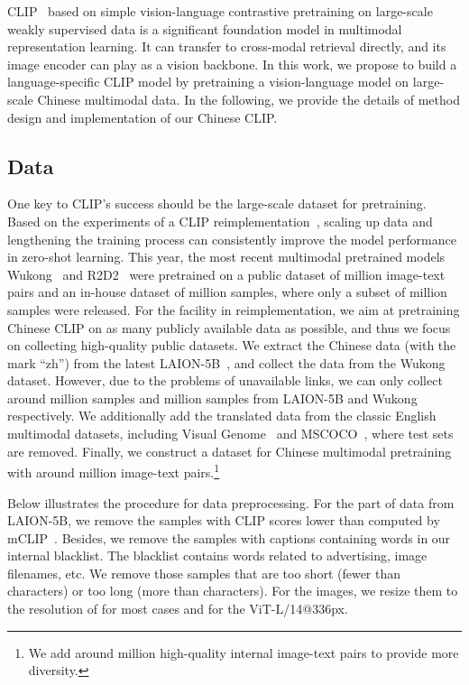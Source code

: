 \documentclass[11pt]{article}
\begin{document}
CLIP~\citep{clip} based on simple vision-language contrastive pretraining on large-scale weakly supervised data is a significant foundation model in multimodal representation learning. It can transfer to cross-modal retrieval directly, and its image encoder can play as a vision backbone. 
In this work, we propose to build a language-specific CLIP model by pretraining a vision-language model on large-scale Chinese multimodal data. 
In the following, we provide the details of method design and implementation of our Chinese CLIP. 






\subsection{Data}
One key to CLIP's success should be the large-scale dataset for pretraining. 
Based on the experiments of a CLIP reimplementation~\citep{openclip}, scaling up data and lengthening the training process can consistently improve the model performance in zero-shot learning. 
This year, the most recent multimodal pretrained models Wukong~\citep{wukong} and R2D2~\citep{r2d2} were pretrained on a public dataset of  million image-text pairs and an in-house dataset of  million samples, where only a subset of  million samples were released. 
For the facility in reimplementation, we aim at pretraining Chinese CLIP on as many publicly available data as possible, and thus we focus on collecting high-quality public datasets. 
We extract the Chinese data (with the mark ``zh'') from the latest LAION-5B~\cite{schuhmann2021laion}, and collect the data from the Wukong dataset. 
However, due to the problems of unavailable links, we can only collect around  million samples and  million samples from LAION-5B and Wukong respectively. 
We additionally add the translated data from the classic English multimodal datasets, including Visual Genome~\cite{vg} and MSCOCO~\citep{coco_cap}, where test sets are removed. 
Finally, we construct a dataset for Chinese multimodal pretraining with around  million image-text pairs.\footnote{We add around  million high-quality internal image-text pairs to provide more diversity. } 


Below illustrates the procedure for data preprocessing. 
For the part of data from LAION-5B, we remove the samples with CLIP scores lower than  computed by mCLIP~\citep{mclip}. 
Besides, we remove the samples with captions containing words in our internal blacklist. 
The blacklist contains words related to advertising, image filenames, etc. 
We remove those samples that are too short (fewer than  characters) or too long (more than  characters). 
For the images, we resize them to the resolution of  for most cases and  for the ViT-L/14@336px. 
\end{document}
